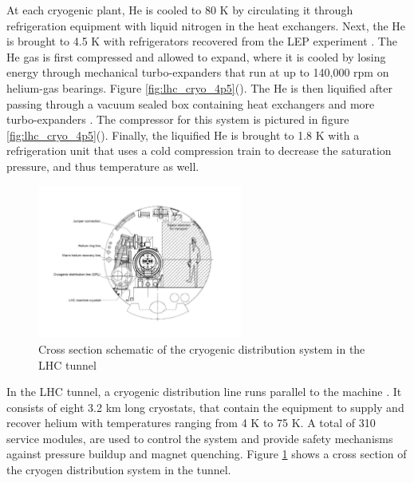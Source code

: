 \par At each cryogenic plant, He is cooled to 80 K by circulating it
through refrigeration equipment with liquid nitrogen in the heat
exchangers\cite{LHC:LHC_lhc_cryogen_cernWebsite}.  Next, the He is
brought to 4.5 K with refrigerators recovered from the LEP experiment
\cite{LHC:LHC_cool_challenge}.  The He gas is first compressed and allowed
to expand, where it is cooled by losing energy through mechanical
turbo-expanders that run at up to 140,000 rpm on helium-gas
bearings.  Figure
\ref{fig:lhc_cryo_4p5}().  The He
is then liquified after passing through a vacuum sealed box containing
heat exchangers and more turbo-expanders
\cite{LHC:LHC_cryogenicHe_system_Lebrun}. The compressor for this
system is pictured in figure
\ref{fig:lhc_cryo_4p5}().  Finally,
the liquified He is brought to 1.8 K with a refrigeration unit that
uses a cold compression train to decrease the saturation pressure, and
thus temperature as well. 

\begin{figure}[h]
   \centering
  \includegraphics[width=0.6\textwidth]{Figures/LHC_Diagrams/LHC_CryogenInTunnel.pdf}
  \caption{Cross section schematic of the cryogenic distribution
    system in the LHC tunnel \cite{lhc:machine_description}} \label{fig:lhc_cryogen_tunnel_xs}
\end{figure}

\par In the LHC tunnel, a cryogenic distribution line runs parallel to
the machine \cite{LHC:LHC_cool_challenge}.  It consists of eight 3.2
km long cryostats, that contain the equipment to supply and recover
helium with temperatures ranging from 4 K to 75 K.  A total of 310
service modules, are used to control the system and provide safety
mechanisms against pressure buildup and magnet quenching.  Figure
\ref{fig:lhc_cryogen_tunnel_xs} shows a cross section of the cryogen
distribution system in the tunnel. 


